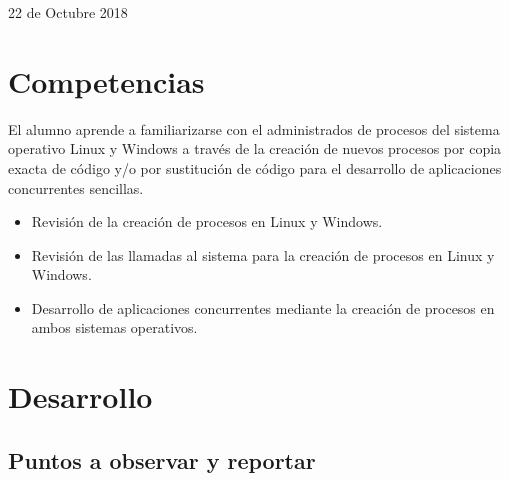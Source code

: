 \documentclass[12pt]{article}
\begin{document}
\begin{titlepage}
\begin{center}
				\vfill
				
				{\large 22 de Octubre 2018}
			\end{center}
		\end{titlepage}
	
	\tableofcontents
	\newpage


	\section{Competencias}
	El alumno aprende a familiarizarse con el administrados de procesos del sistema operativo Linux y Windows a través de la creación de nuevos procesos por copia exacta de código y/o por sustitución de código para el desarrollo de aplicaciones concurrentes sencillas.
    \begin{itemize}
        \item[\Checkmark] Revisión de la creación de procesos en Linux y Windows.

        \item[\Checkmark] Revisión de las llamadas al sistema para la creación de procesos en Linux y Windows.

        \item[\Checkmark] Desarrollo de aplicaciones concurrentes mediante la creación de procesos en ambos sistemas operativos.
    \end{itemize}
	
	
    \section{Desarrollo}
    \subsection{Puntos a observar y reportar}
            
        
\end{document}
